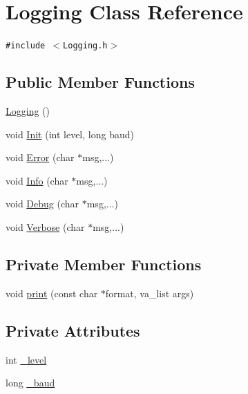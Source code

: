 \hypertarget{class_logging}{
\section{Logging Class Reference}
\label{class_logging}
}
{\tt \#include $<$Logging.h$>$}

\subsection*{Public Member Functions}
\begin{CompactItemize}
\item 
\hyperlink{class_logging_cc3d848a3d05076fd185cd95e9c648d5}{Logging} ()
\item 
void \hyperlink{class_logging_f6a890a6feac5bf93b04cb22db7bd530}{Init} (int level, long baud)
\item 
void \hyperlink{class_logging_1cf44ab531c72761fba811882336a2ad}{Error} (char $\ast$msg,...)
\item 
void \hyperlink{class_logging_8a99e1a55e2b24d864d89e9aa86b2f2e}{Info} (char $\ast$msg,...)
\item 
void \hyperlink{class_logging_e0fcd9e5350d7b9158c8ae9289fef193}{Debug} (char $\ast$msg,...)
\item 
void \hyperlink{class_logging_2ae6a981ea685c851b87cf4c1ec2fb8f}{Verbose} (char $\ast$msg,...)
\end{CompactItemize}
\subsection*{Private Member Functions}
\begin{CompactItemize}
\item 
void \hyperlink{class_logging_714840794950ab31df5da5b95322e391}{print} (const char $\ast$format, va\_\-list args)
\end{CompactItemize}
\subsection*{Private Attributes}
\begin{CompactItemize}
\item 
int \hyperlink{class_logging_117105f639285ba5922836121294c04a}{\_\-level}
\item 
long \hyperlink{class_logging_8a2fe833b6e957b763146c32d6be5f2d}{\_\-baud}
\end{CompactItemize}


